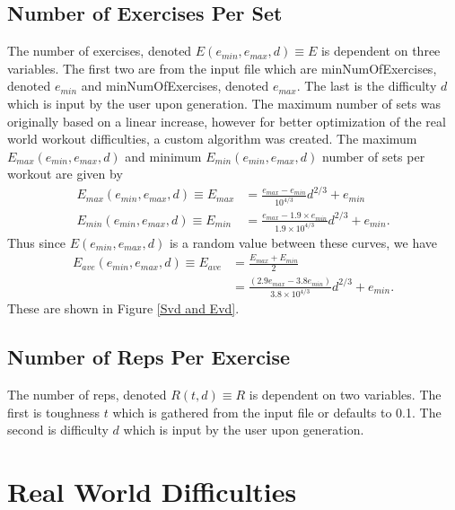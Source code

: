 \subsection{Number of Exercises Per Set}

The number of exercises, denoted $E(e_{min},e_{max},d) \equiv E$ is dependent on three variables. The first two are from the input file which are minNumOfExercises, denoted $e_{min}$ and minNumOfExercises, denoted $e_{max}$. The last is the difficulty $d$ which is input by the user upon generation. The maximum number of sets was originally based on a linear increase, however for better optimization of the real world workout difficulties, a custom algorithm was created. The maximum $E_{max}(e_{min},e_{max},d)$ and minimum $E_{min}(e_{min},e_{max},d)$ number of sets per workout are given by
\begin{align}
E_{max}(e_{min},e_{max},d) \equiv E_{max}&= \frac{e_{max}-e_{min}}{10^{4/3}} d^{2/3}+e_{min} \\
E_{min}(e_{min},e_{max},d) \equiv E_{min}&= \frac{e_{max}-1.9 \times e_{min}}{1.9 \times 10^{4/3}} d^{2/3}+e_{min}.
\end{align}
Thus since $E(e_{min},e_{max},d)$ is a random value between these curves, we have
\begin{align}
E_{ave}(e_{min},e_{max},d) \equiv E_{ave} &= \frac{E_{max}+ E_{min}}{2} \\ &= \frac{\left(2.9e_{max}-3.8e_{min}\right)}{3.8 \times 10^{4/3}}d^{2/3}+e_{min}.
\end{align}
These are shown in Figure \ref{Svd and Evd}.


\subsection{Number of Reps Per Exercise}

The number of reps, denoted $R(t,d) \equiv R$ is dependent on two variables. The first is toughness $t$ which is gathered from the input file or defaults to 0.1. The second is difficulty $d$ which is input by the user upon generation.



\section{Real World Difficulties} 

